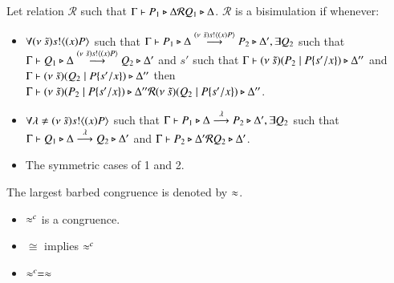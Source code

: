 \begin{definition}[Bisimulation]\rm
	Let relation $\mathcal{R}$ such that $\Gamma \vdash P_1 \triangleright \Delta \mathcal{R} Q_1 \triangleright \Delta$.
	$\mathcal{R}$ is a bisimulation if whenever:
	\begin{itemize}
		\item	$\forall (\nu\ \tilde{s}) s ! \langle (x)P \rangle$ such that $\Gamma \vdash P_1 \triangleright \Delta \stackrel{(\nu\ \tilde{s}) s ! \langle (x)P \rangle}{\longrightarrow} P_2 \triangleright \Delta', \exists
			Q_2$ such that $\Gamma \vdash Q_1 \triangleright \Delta \stackrel{(\nu\ \tilde{s}) s ! \langle (x)P \rangle}{\longrightarrow} Q_2 \triangleright \Delta'$ and
			$s'$ such that $\Gamma \vdash (\nu\ \tilde{s})(P_2 \;|\; P \{s'/x \}) \triangleright \Delta''$ and
			$\Gamma \vdash (\nu\ \tilde{s})(Q_2 \;|\; P \{s'/x \}) \triangleright \Delta''$ then
			$\Gamma \vdash (\nu\ \tilde{s})(P_2 \;|\; P \{s'/x \}) \triangleright \Delta'' \mathcal{R} (\nu\ \tilde{s})(Q_2 \;|\; P \{s'/x \}) \triangleright \Delta''$.

		\item	$\forall \lambda \not= (\nu\ \tilde{s}) s ! \langle (x)P \rangle$ such that $\Gamma \vdash P_1 \triangleright \Delta \stackrel{\lambda}{\longrightarrow} P_2 \triangleright \Delta', \exists
			Q_2$ such that $\Gamma \vdash Q_1 \triangleright \Delta \stackrel{\lambda}{\longrightarrow} Q_2 \triangleright \Delta'$ and
			$\Gamma \vdash P_2 \triangleright \Delta' \mathcal{R} Q_2 \triangleright \Delta'$.

		\item	The symmetric cases of 1 and 2.
	\end{itemize}
	The largest barbed congruence is denoted by $\approx$.
\end{definition}

\begin{theorem}
	\begin{itemize}
		\item	$\approx^c$ is a congruence.
		\item	$\cong$ implies $\approx^c$
		\item	$\approx^c = \approx$
	\end{itemize}
\end{theorem}

